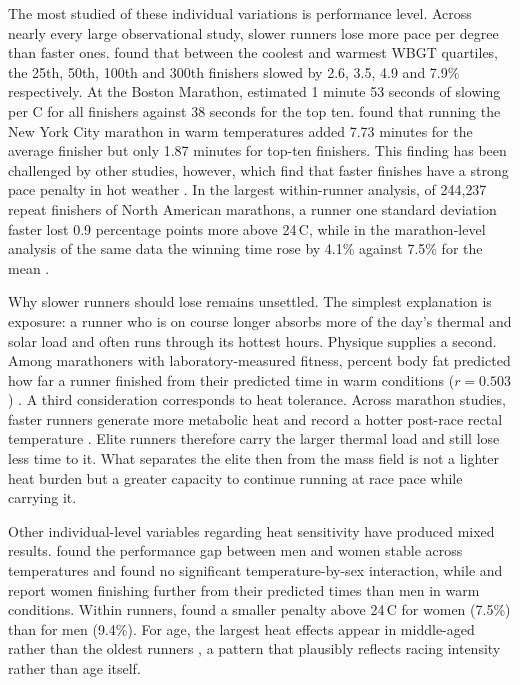 \documentclass[11pt]{article}
\renewcommand{\_}{\textunderscore\allowbreak}
\begin{document}
The most studied of these individual variations is performance level. Across nearly every large observational study, slower runners lose more pace per degree than faster ones. \citet{ely2007} found that between the coolest and warmest WBGT quartiles, the 25th, 50th, 100th and 300th finishers slowed by 2.6, 3.5, 4.9 and 7.9\% respectively. At the Boston Marathon, \citet{nikolaidis2019} estimated 1 minute 53 seconds of slowing per \textdegree C for all finishers against 38 seconds for the top ten. \citet{knechtle2021b} found that running the New York City marathon in warm temperatures added 7.73 minutes for the average finisher but only 1.87 minutes for top-ten finishers. This finding has been challenged by other studies, however, which find that faster finishes have a strong pace penalty in hot weather \citep{gasparetto2020, knechtle2021a}. In the largest within-runner analysis, of 244{,}237 repeat finishers of North American marathons, a runner one standard deviation faster lost 0.9 percentage points more above 24\,\textdegree C, while in the marathon-level analysis of the same data the winning time rose by 4.1\% against 7.5\% for the mean \citep{oliveira2026}.

Why slower runners should lose remains unsettled. The simplest explanation is exposure: a runner who is on course longer absorbs more of the day's thermal and solar load and often runs through its hottest hours. Physique supplies a second. Among marathoners with laboratory-measured fitness, percent body fat predicted how far a runner finished from their predicted time in warm conditions ($r = 0.503$) \citep{roach2012}. A third consideration corresponds to heat tolerance. Across marathon studies, faster runners generate more metabolic heat and record a hotter post-race rectal temperature \citep{cheuvront2001}. Elite runners therefore carry the larger thermal load and still lose less time to it. What separates the elite then from the mass field is not a lighter heat burden but a greater capacity to continue running at race pace while carrying it.

Other individual-level variables regarding heat sensitivity have produced mixed results. \citet{elhelou2012} found the performance gap between men and women stable across temperatures and \citet{knechtle2021b} found no significant temperature-by-sex interaction, while \citet{roach2012} and \citet{llewellyn2025} report women finishing further from their predicted times than men in warm conditions. Within runners, \citet{oliveira2026} found a smaller penalty above 24\,\textdegree C for women (7.5\%) than for men (9.4\%). For age, the largest heat effects appear in middle-aged rather than the oldest runners \citep{knechtle2021b, weiss2022a}, a pattern that plausibly reflects racing intensity rather than age itself.
\end{document}
